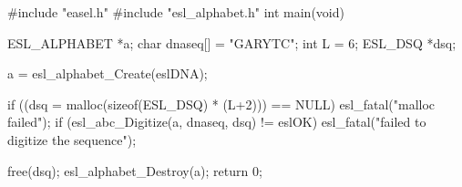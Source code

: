 \begin{cchunk}
#include "easel.h"
#include "esl_alphabet.h"
int main(void)
{
  ESL_ALPHABET *a;
  char          dnaseq[] = "GARYTC";
  int           L        = 6;
  ESL_DSQ      *dsq;
  
  a = esl_alphabet_Create(eslDNA);

  if ((dsq = malloc(sizeof(ESL_DSQ) * (L+2))) == NULL)  esl_fatal("malloc failed");
  if (esl_abc_Digitize(a, dnaseq, dsq)       != eslOK)  esl_fatal("failed to digitize the sequence");

  free(dsq);
  esl_alphabet_Destroy(a);
  return 0;
}
\end{cchunk}

